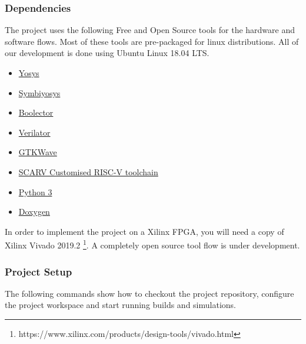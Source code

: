 
\subsubsection{Dependencies}

The project uses the following Free and Open Source tools for
the hardware and software flows.
Most of these tools are pre-packaged for linux distributions.
All of our development is done using Ubuntu Linux 18.04 LTS.

\begin{itemize}[noitemsep]
\item \href{http://www.clifford.at/yosys/}{Yosys}
\item \href{https://symbiyosys.readthedocs.io/en/latest/}{Symbiyosys}
\item \href{https://boolector.github.io/}{Boolector}
\item \href{https://www.veripool.org/wiki/verilator}{Verilator}
\item \href{http://gtkwave.sourceforge.net/}{GTKWave}
\item \href{https://github.com/scarv/xcrypto.git}{SCARV Customised RISC-V toolchain}
\item \href{https://www.python.org/downloads/}{Python 3}
\item \href{http://www.doxygen.nl}{Doxygen}
\end{itemize}

In order to implement the project on a Xilinx FPGA, you will
need a copy of Xilinx Vivado 2019.2
\footnote{https://www.xilinx.com/products/design-tools/vivado.html}.
A completely open source tool flow is under development.

\subsubsection{Project Setup}

The following commands show how to checkout the \SCARVSOC project
repository, configure the project workspace and start running
builds and simulations.

